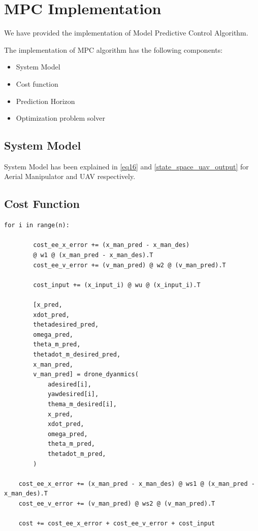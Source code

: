 \section{MPC Implementation}

We have provided the implementation of Model Predictive Control Algorithm. 

The implementation of MPC algorithm has the following components:

\begin{itemize}
    \item System Model
    \item Cost function
    \item Prediction Horizon
    \item Optimization problem solver
\end{itemize}

\subsection{System Model}

System Model has been explained in \ref{eq16} and \ref{state_space_uav_output} for Aerial Manipulator and UAV respectively.

\subsection{Cost Function}


\begin{lstlisting}
for i in range(n):
        
        cost_ee_x_error += (x_man_pred - x_man_des) 
        @ w1 @ (x_man_pred - x_man_des).T
        cost_ee_v_error += (v_man_pred) @ w2 @ (v_man_pred).T
        
        cost_input += (x_input_i) @ wu @ (x_input_i).T
        
        [x_pred,
        xdot_pred,
        thetadesired_pred,
        omega_pred,
        theta_m_pred,
        thetadot_m_desired_pred,
        x_man_pred,
        v_man_pred] = drone_dyanmics(
            adesired[i], 
            yawdesired[i], 
            thema_m_desired[i],
            x_pred,
            xdot_pred,
            omega_pred,
            theta_m_pred,
            thetadot_m_pred,
        )

    cost_ee_x_error += (x_man_pred - x_man_des) @ ws1 @ (x_man_pred - x_man_des).T
    cost_ee_v_error += (v_man_pred) @ ws2 @ (v_man_pred).T
    
    cost += cost_ee_x_error + cost_ee_v_error + cost_input

\end{lstlisting}

